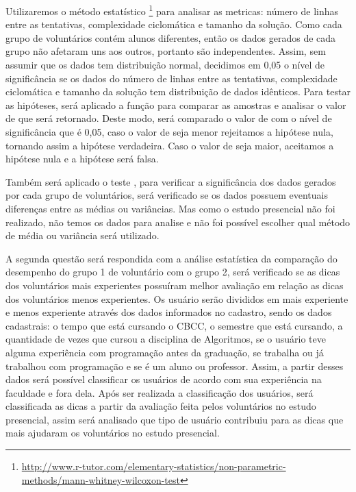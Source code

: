 Utilizaremos o método estatístico \footnote{\url{http://www.r-tutor.com/elementary-statistics/non-parametric-methods/mann-whitney-wilcoxon-test}} para analisar as metricas: número de linhas entre as tentativas, complexidade ciclomática e tamanho da solução. Como cada grupo de voluntários contém alunos diferentes, então os dados gerados de cada grupo não afetaram uns aos outros, portanto são independentes. Assim, sem assumir que os dados tem distribuição normal, decidimos em 0,05 o nível de significância se os dados do número de linhas entre as tentativas, complexidade ciclomática e tamanho da solução tem distribuição de dados idênticos. Para testar as hipóteses, será aplicado a função  para comparar as amostras e analisar o valor de  que será retornado. Deste modo, será comparado o valor de  com o nível de significância que é 0,05, caso o valor de  seja menor rejeitamos a hipótese nula, tornando assim a hipótese verdadeira. Caso o valor de  seja maior, aceitamos a hipótese nula e a hipótese será falsa. 

Também será aplicado o teste  \cite{macbeth2011cliff}, para verificar a significância dos dados gerados por cada grupo de voluntários, será verificado se os dados possuem eventuais diferenças entre as médias ou variâncias. Mas como o estudo presencial não foi realizado, não temos os dados para analise e não foi possível escolher qual método de média ou variância será utilizado.

A segunda questão será respondida com a análise estatística da comparação do desempenho do grupo 1 de voluntário com o grupo 2, será verificado se as dicas dos voluntários mais experientes possuíram melhor avaliação em relação as dicas dos voluntários menos experientes. Os usuário serão divididos em mais experiente e menos experiente através dos dados informados no cadastro, sendo os dados cadastrais: o tempo que está cursando o CBCC, o semestre que está cursando, a quantidade de vezes que cursou a disciplina de Algoritmos, se o usuário teve alguma experiência com programação antes da graduação, se trabalha ou já trabalhou com programação e se é um aluno ou professor. Assim, a partir desses dados será possível classificar os usuários de acordo com sua experiência na faculdade e fora dela. Após ser realizada a classificação dos usuários, será classificada as dicas a partir da avaliação feita pelos voluntários no estudo presencial, assim será analisado que tipo de usuário contribuiu para as dicas que mais ajudaram os voluntários no estudo presencial.